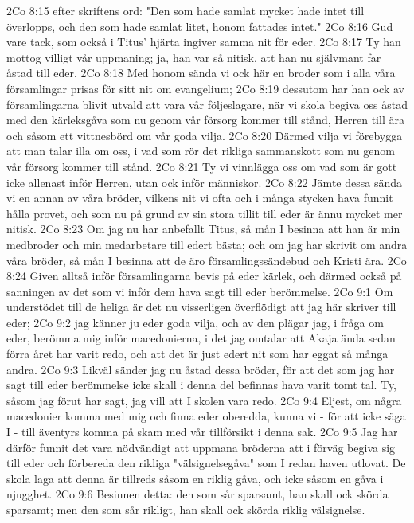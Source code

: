 2Co 8:15  efter skriftens ord: "Den som hade samlat mycket hade intet till överlopps, och den som hade samlat litet, honom fattades intet."
2Co 8:16  Gud vare tack, som också i Titus' hjärta ingiver samma nit för eder.
2Co 8:17  Ty han mottog villigt vår uppmaning; ja, han var så nitisk, att han nu självmant far åstad till eder.
2Co 8:18  Med honom sända vi ock här en broder som i alla våra församlingar prisas för sitt nit om evangelium;
2Co 8:19  dessutom har han ock av församlingarna blivit utvald att vara vår följeslagare, när vi skola begiva oss åstad med den kärleksgåva som nu genom vår försorg kommer till stånd, Herren till ära och såsom ett vittnesbörd om vår goda vilja.
2Co 8:20  Därmed vilja vi förebygga att man talar illa om oss, i vad som rör det rikliga sammanskott som nu genom vår försorg kommer till stånd.
2Co 8:21  Ty vi vinnlägga oss om vad som är gott icke allenast inför Herren, utan ock inför människor.
2Co 8:22  Jämte dessa sända vi en annan av våra bröder, vilkens nit vi ofta och i många stycken hava funnit hålla provet, och som nu på grund av sin stora tillit till eder är ännu mycket mer nitisk.
2Co 8:23  Om jag nu har anbefallt Titus, så mån I besinna att han är min medbroder och min medarbetare till edert bästa; och om jag har skrivit om andra våra bröder, så mån I besinna att de äro församlingssändebud och Kristi ära.
2Co 8:24  Given alltså inför församlingarna bevis på eder kärlek, och därmed också på sanningen av det som vi inför dem hava sagt till eder berömmelse.
2Co 9:1  Om understödet till de heliga är det nu visserligen överflödigt att jag här skriver till eder;
2Co 9:2  jag känner ju eder goda vilja, och av den plägar jag, i fråga om eder, berömma mig inför macedonierna, i det jag omtalar att Akaja ända sedan förra året har varit redo, och att det är just edert nit som har eggat så många andra.
2Co 9:3  Likväl sänder jag nu åstad dessa bröder, för att det som jag har sagt till eder berömmelse icke skall i denna del befinnas hava varit tomt tal. Ty, såsom jag förut har sagt, jag vill att I skolen vara redo.
2Co 9:4  Eljest, om några macedonier komma med mig och finna eder oberedda, kunna vi - för att icke säga I - till äventyrs komma på skam med vår tillförsikt i denna sak.
2Co 9:5  Jag har därför funnit det vara nödvändigt att uppmana bröderna att i förväg begiva sig till eder och förbereda den rikliga "välsignelsegåva" som I redan haven utlovat. De skola laga att denna är tillreds såsom en riklig gåva, och icke såsom en gåva i njugghet.
2Co 9:6  Besinnen detta: den som sår sparsamt, han skall ock skörda sparsamt; men den som sår rikligt, han skall ock skörda riklig välsignelse.

